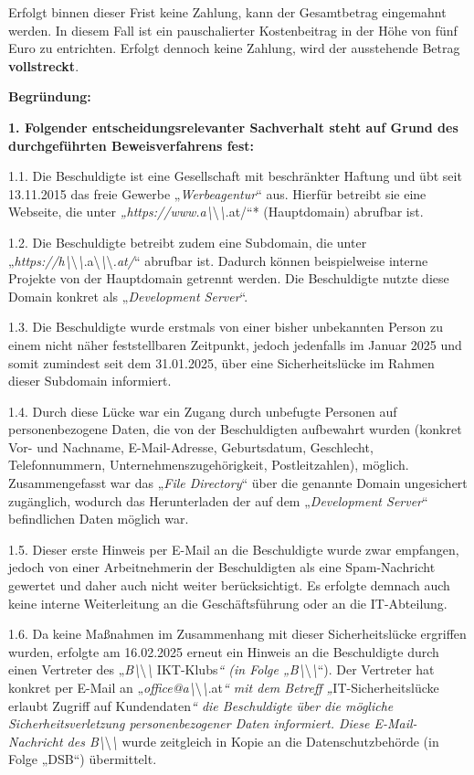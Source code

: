 \documentclass[11pt,a4paper]{article}
\begin{document}
Erfolgt binnen dieser Frist keine Zahlung, kann der Gesamtbetrag eingemahnt werden. In diesem Fall ist ein pauschalierter Kostenbeitrag in der Höhe von fünf Euro zu entrichten. Erfolgt dennoch keine Zahlung, wird der ausstehende Betrag \textbf{vollstreckt}.

\textbf{Begründung:}

\textbf{1. Folgender entscheidungsrelevanter Sachverhalt steht auf Grund des durchgeführten Beweisverfahrens fest:}

1.1. Die Beschuldigte ist eine Gesellschaft mit beschränkter Haftung und übt seit 13.11.2015 das freie Gewerbe „\textit{Werbeagentur}“ aus. Hierfür betreibt sie eine Webseite, die unter \textit{„https://www.a\textbackslash{}}\textbackslash{}\textit{\textbackslash{}}.at/“* (Hauptdomain) abrufbar ist.

1.2. Die Beschuldigte betreibt zudem eine Subdomain, die unter „\textit{https://h\textbackslash{}}\textbackslash{}\textit{\textbackslash{}}.a\textbackslash{}\textit{\textbackslash{}}\textbackslash{}\textit{.at/}“ abrufbar ist. Dadurch können beispielweise interne Projekte von der Hauptdomain getrennt werden. Die Beschuldigte nutzte diese Domain konkret als „\textit{Development Server}“.

1.3. Die Beschuldigte wurde erstmals von einer bisher unbekannten Person zu einem nicht näher feststellbaren Zeitpunkt, jedoch jedenfalls im Januar 2025 und somit zumindest seit dem 31.01.2025, über eine Sicherheitslücke im Rahmen dieser Subdomain informiert.

1.4. Durch diese Lücke war ein Zugang durch unbefugte Personen auf personenbezogene Daten, die von der Beschuldigten aufbewahrt wurden (konkret Vor- und Nachname, E-Mail-Adresse, Geburtsdatum, Geschlecht, Telefonnummern, Unternehmenszugehörigkeit, Postleitzahlen), möglich. Zusammengefasst war das „\textit{File Directory}“ über die genannte Domain ungesichert zugänglich, wodurch das Herunterladen der auf dem „\textit{Development Server}“ befindlichen Daten möglich war.

1.5. Dieser erste Hinweis per E-Mail an die Beschuldigte wurde zwar empfangen, jedoch von einer Arbeitnehmerin der Beschuldigten als eine Spam-Nachricht gewertet und daher auch nicht weiter berücksichtigt. Es erfolgte demnach auch keine interne Weiterleitung an die Geschäftsführung oder an die IT-Abteilung.

1.6. Da keine Maßnahmen im Zusammenhang mit dieser Sicherheitslücke ergriffen wurden, erfolgte am 16.02.2025 erneut ein Hinweis an die Beschuldigte durch einen Vertreter des „\textit{B\textbackslash{}}\textbackslash{}\textit{\textbackslash{}} IKT-Klubs\textit{“ (in Folge „B\textbackslash{}}\textbackslash{}\textit{\textbackslash{}}“). Der Vertreter hat konkret per E-Mail an „\textit{office@a\textbackslash{}}\textbackslash{}\textit{\textbackslash{}}.at\textit{“ mit dem Betreff „}IT-Sicherheitslücke erlaubt Zugriff auf Kundendaten\textit{“ die Beschuldigte über die mögliche Sicherheitsverletzung personenbezogener Daten informiert. Diese E-Mail-Nachricht des B\textbackslash{}}\textbackslash{}\textit{\textbackslash{}} wurde zeitgleich in Kopie an die Datenschutzbehörde (in Folge „DSB“) übermittelt.
\end{document}
